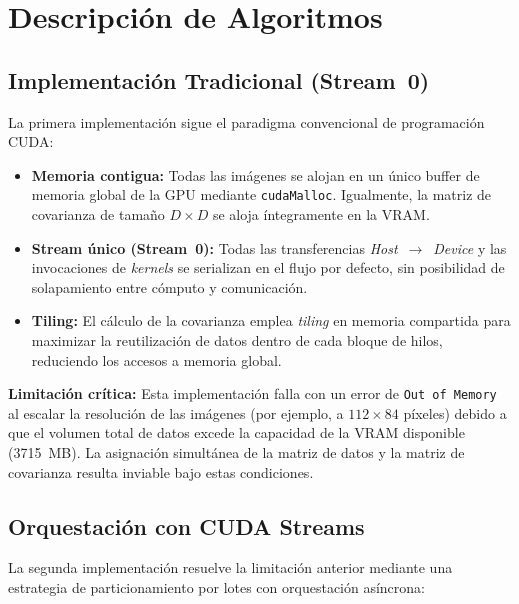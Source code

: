 \documentclass[12pt, a4paper]{article}
\begin{document}
\section{Descripción de Algoritmos}

\subsection{Implementación Tradicional (Stream~0)}

La primera implementación sigue el paradigma convencional de programación CUDA:

\begin{itemize}
    \item \textbf{Memoria contigua:} Todas las imágenes se alojan en un único
          buffer de memoria global de la GPU mediante \texttt{cudaMalloc}.
          Igualmente, la matriz de covarianza de tamaño $D \times D$ se aloja
          íntegramente en la VRAM.

    \item \textbf{Stream único (Stream~0):} Todas las transferencias
          \textit{Host}~$\to$~\textit{Device} y las invocaciones de
          \textit{kernels} se serializan en el flujo por defecto, sin
          posibilidad de solapamiento entre cómputo y comunicación.

    \item \textbf{Tiling:} El cálculo de la covarianza emplea \textit{tiling}
          en memoria compartida para maximizar la reutilización de datos dentro
          de cada bloque de hilos, reduciendo los accesos a memoria global.
\end{itemize}

\textbf{Limitación crítica:} Esta implementación falla con un error de
\texttt{Out of Memory} al escalar la resolución de las imágenes (por ejemplo,
a $112 \times 84$ píxeles) debido a que el volumen total de datos excede la
capacidad de la VRAM disponible (3715~MB). La asignación simultánea de la
matriz de datos y la matriz de covarianza resulta inviable bajo estas
condiciones.

\subsection{Orquestación con CUDA Streams}

La segunda implementación resuelve la limitación anterior mediante una
estrategia de particionamiento por lotes con orquestación asíncrona:
\end{document}
